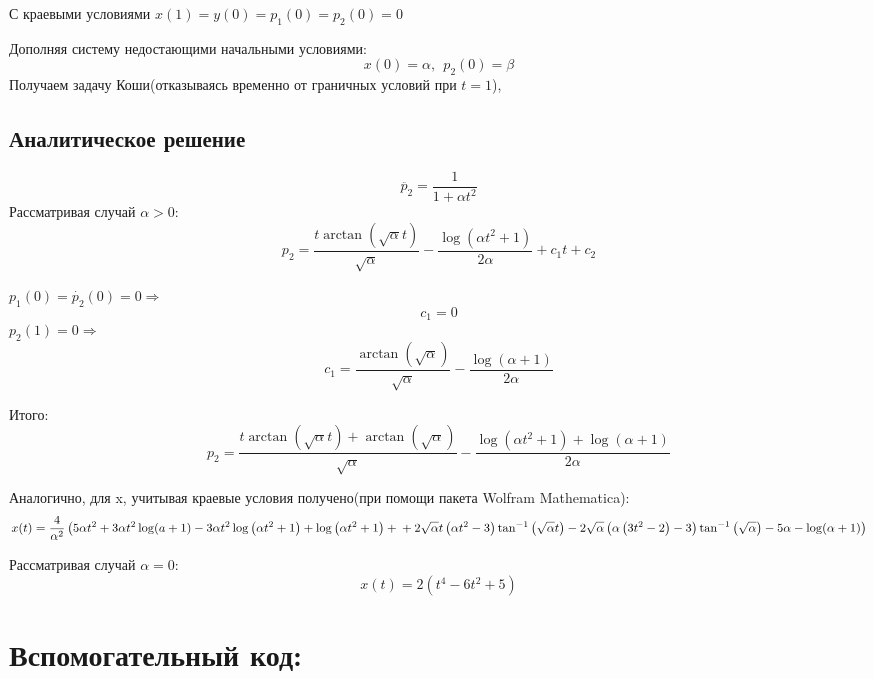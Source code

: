 \documentclass[11pt]{article}
\begin{document}
С краевыми условиями \(x(1) = y(0) = p_1(0) = p_2(0) = 0\)

Дополняя систему недостающими начальными условиями:
\[x(0) = \alpha, \ \ p_2(0) = \beta\] Получаем задачу Коши(отказываясь
временно от граничных условий при \(t = 1\)),

    \hypertarget{ux430ux43dux430ux43bux438ux442ux438ux447ux435ux441ux43aux43eux435-ux440ux435ux448ux435ux43dux438ux435}{%
\subsection{Аналитическое
решение}\label{ux430ux43dux430ux43bux438ux442ux438ux447ux435ux441ux43aux43eux435-ux440ux435ux448ux435ux43dux438ux435}}

    \[\ddot{p_2} = \frac{1}{1+\alpha t^2}\] Рассматривая случай
\(\alpha>0\):
\[p_2 = \frac{t \arctan\left(\sqrt{\alpha} t\right)}{\sqrt{\alpha}} -\frac{\log \left(\alpha t^2+1\right)}{2 \alpha} +c_1 t+c_2\]

\(p_1(0) = \dot{p_2}(0) = 0 \Rightarrow\) \[c_1 = 0\]
\(p_2(1) = 0 \Rightarrow\)
\[c_1 = \frac{\arctan \left(\sqrt{\alpha}\right)}{\sqrt{\alpha}}-\frac{\log (\alpha+1)}{2 \alpha}\]

Итого:
\[p_2 = \frac{t \arctan\left(\sqrt{\alpha} t\right)  + \arctan \left(\sqrt{\alpha}\right)}{\sqrt{\alpha}} - 
\frac{\log \left(\alpha t^2+1\right) + \log (\alpha+1)}{2 \alpha} \]

Аналогично, для x, учитывая краевые условия получено(при помощи пакета
Wolfram Mathematica):
\[x(t) = \frac{4}{\alpha^2} \left(5 \alpha t^2+3 \alpha t^2 \log (a+1)-3 \alpha t^2 \log \left(\alpha t^2+1\right)+\log \left(\alpha t^2+1\right)+ \\
+2 \sqrt{\alpha} t \left(\alpha t^2-3\right) \tan ^{-1}\left(\sqrt{\alpha} t\right)-2 \sqrt{\alpha} \left(\alpha \left(3 t^2-2\right)-3\right) \tan ^{-1}\left(\sqrt{\alpha}\right)-5 \alpha -\log (\alpha+1)\right)\]

    Рассматривая случай \(\alpha = 0\):
\[x(t) = 2 \left(t^4-6 t^2+5\right)\]

    \hypertarget{ux432ux441ux43fux43eux43cux43eux433ux430ux442ux435ux43bux44cux43dux44bux439-ux43aux43eux434}{%
\section{Вспомогательный
код:}\label{ux432ux441ux43fux43eux43cux43eux433ux430ux442ux435ux43bux44cux43dux44bux439-ux43aux43eux434}}
\end{document}
